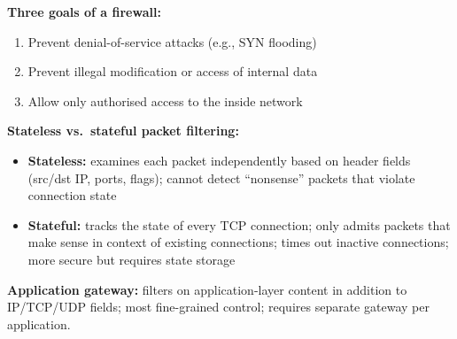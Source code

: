 \begin{tcolorbox}[exambox, title=V23 Q6 -- Firewalls -- Three Goals and Types]
\textbf{Three goals of a firewall:}
\begin{enumerate}[noitemsep]
  \item Prevent denial-of-service attacks (e.g., SYN flooding)
  \item Prevent illegal modification or access of internal data
  \item Allow only authorised access to the inside network
\end{enumerate}

\textbf{Stateless vs.\ stateful packet filtering:}
\begin{itemize}[noitemsep]
  \item \textbf{Stateless:} examines each packet independently based on header fields (src/dst IP, ports, flags); cannot detect ``nonsense'' packets that violate connection state
  \item \textbf{Stateful:} tracks the state of every TCP connection; only admits packets that make sense in context of existing connections; times out inactive connections; more secure but requires state storage
\end{itemize}

\textbf{Application gateway:} filters on application-layer content in addition to IP/TCP/UDP fields; most fine-grained control; requires separate gateway per application.
\end{tcolorbox}
